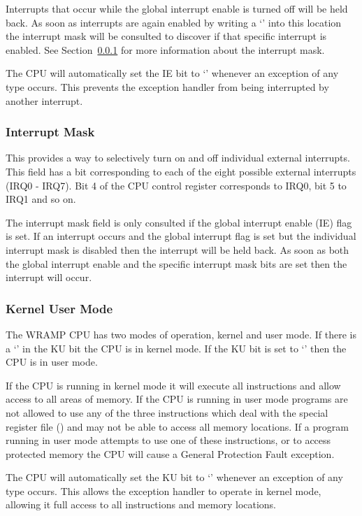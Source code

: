 Interrupts that occur while the global interrupt enable is turned off
will be held back. As soon as interrupts are again enabled by writing
a `' into this location the interrupt mask will be consulted
to discover if that specific interrupt is enabled. See
Section~\ref{sec:imask} for more information about the interrupt mask.

The CPU will automatically set the IE bit to `' whenever an
exception of any type occurs. This prevents the exception handler
from being interrupted by another interrupt.

\subsubsection{Interrupt Mask}
\label{sec:imask}

This provides a way to selectively turn on and off individual external
interrupts. This field has a bit corresponding to each of the eight
possible external interrupts (IRQ0 - IRQ7). Bit 4 of the CPU control
register corresponds to IRQ0, bit 5 to IRQ1 and so on.

The interrupt mask field is only consulted if the global interrupt
enable (IE) flag is set. If an interrupt occurs and the global
interrupt flag is set but the individual interrupt mask is disabled
then the interrupt will be held back. As soon as both the global
interrupt enable and the specific interrupt mask bits are set then the
interrupt will occur.

\subsubsection{Kernel User Mode}

The WRAMP CPU has two modes of operation, kernel and user mode. If
there is a `' in the KU bit the CPU is in kernel mode. If
the KU bit is set to `' then the CPU is in user mode. 

If the CPU is running in kernel mode it will execute all instructions and
allow access to all areas of memory. If the CPU is running in user
mode programs are not allowed to use any of the three instructions
which deal with the special register file ()
and may not be able to access all memory locations. If a program
running in user mode attempts to use one of these instructions, or to
access protected memory the CPU will cause a General Protection Fault
exception. %

The CPU will automatically set the KU bit to `' whenever an
exception of any type occurs. This allows the exception handler to
operate in kernel mode, allowing it full access to all instructions
and memory locations.

